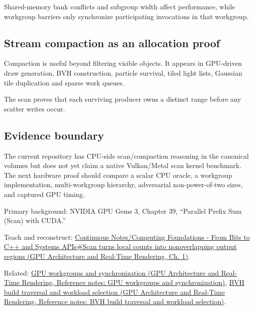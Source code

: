 Shared-memory bank conflicts and subgroup width affect performance, while workgroup barriers only synchronize participating invocations in that workgroup.

\subsection{Stream compaction as an allocation proof}\label{appendix-f2ee4d086415-stream-compaction-as-an-allocation-proof}

\hypertarget{appendix-f2ee4d086415-stream-compaction-as-an-allocation-proof}{}

Compaction is useful beyond filtering visible objects. It appears in GPU-driven draw generation, BVH construction, particle survival, tiled light lists, Gaussian tile duplication and sparse work queues.

The scan proves that each surviving producer owns a distinct range before any scatter writes occur.

\subsection{Evidence boundary}\label{appendix-f2ee4d086415-evidence-boundary}

\hypertarget{appendix-f2ee4d086415-evidence-boundary}{}

The current repository has CPU-side scan/compaction reasoning in the canonical volumes but does not yet claim a native Vulkan/Metal scan kernel benchmark. The next hardware proof should compare a scalar CPU oracle, a workgroup implementation, multi-workgroup hierarchy, adversarial non-power-of-two sizes, and captured GPU timing.

Primary background: NVIDIA GPU Gems 3, Chapter 39, ``Parallel Prefix Sum (Scan) with CUDA.''

Teach and reconstruct: \href{../06-GPU-Architecture-and-Real-Time-Rendering/main.pdf\#nameddest=01-foundations-i-ch008-scan-turns-local-counts-into-nonoverlapping-output-regions}{Continuous Notes/Computing Foundations - From Bits to C++ and Systems APIs\#Scan turns local counts into nonoverlapping output regions (GPU Architecture and Real-Time Rendering, Ch. 1)}.

Related: \href{../06-GPU-Architecture-and-Real-Time-Rendering/main.pdf\#nameddest=appendix-f662b5b1773b}{GPU workgroups and synchronization (GPU Architecture and Real-Time Rendering, Reference notes: GPU workgroups and synchronization)}, \href{../06-GPU-Architecture-and-Real-Time-Rendering/main.pdf\#nameddest=appendix-5653a7aea6bb}{BVH build traversal and workload selection (GPU Architecture and Real-Time Rendering, Reference notes: BVH build traversal and workload selection)}.
